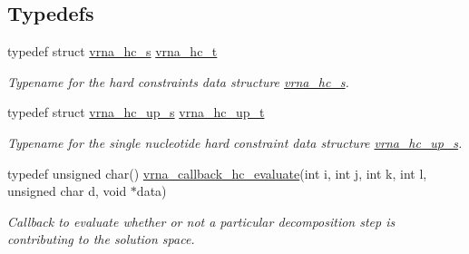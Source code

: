 \subsection*{Typedefs}
\begin{DoxyCompactItemize}
\item 
\mbox{\label{group__hard__constraints_gac7e4c4f8abe3163a68110c5bff24e01d}} 
typedef struct \hyperlink{group__hard__constraints_structvrna__hc__s}{vrna\+\_\+hc\+\_\+s} \hyperlink{group__hard__constraints_gac7e4c4f8abe3163a68110c5bff24e01d}{vrna\+\_\+hc\+\_\+t}
\begin{DoxyCompactList}\small\item\em Typename for the hard constraints data structure \hyperlink{group__hard__constraints_structvrna__hc__s}{vrna\+\_\+hc\+\_\+s}. \end{DoxyCompactList}\item 
\mbox{\label{group__hard__constraints_ga8cd53427a942a81c87ec526bbff32ef9}} 
typedef struct \hyperlink{group__hard__constraints_structvrna__hc__up__s}{vrna\+\_\+hc\+\_\+up\+\_\+s} \hyperlink{group__hard__constraints_ga8cd53427a942a81c87ec526bbff32ef9}{vrna\+\_\+hc\+\_\+up\+\_\+t}
\begin{DoxyCompactList}\small\item\em Typename for the single nucleotide hard constraint data structure \hyperlink{group__hard__constraints_structvrna__hc__up__s}{vrna\+\_\+hc\+\_\+up\+\_\+s}. \end{DoxyCompactList}\item 
typedef unsigned char() \hyperlink{group__hard__constraints_gae465f1d4a3d8b6592b38ecbb0d9f613d}{vrna\+\_\+callback\+\_\+hc\+\_\+evaluate}(int i, int j, int k, int l, unsigned char d, void $\ast$data)
\begin{DoxyCompactList}\small\item\em Callback to evaluate whether or not a particular decomposition step is contributing to the solution space. \end{DoxyCompactList}\end{DoxyCompactItemize}
